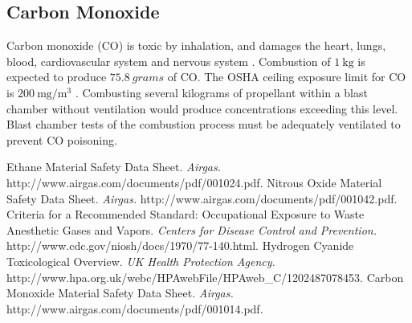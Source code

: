 \documentclass{article}
\begin{document}
\subsection{Carbon Monoxide}
Carbon monoxide (CO) is toxic by inhalation, and damages the heart, lungs, blood, cardiovascular system and nervous system \cite{COtox}.
Combustion of $\SI{1}{\kg}$ is expected to produce $\SI{75.8}{grams}$ of CO. 
The OSHA ceiling exposure limit for CO is $\SI{200}{\milli\gram\per\cubic\metre}$ \cite{COtox}. 
Combusting several kilograms of propellant within a blast chamber without ventilation would produce concentrations exceeding this level. 
Blast chamber tests of the combustion process must be adequately ventilated to prevent CO poisoning.

\begin{thebibliography}{9}
	 Ethane Material Safety Data Sheet. \emph{Airgas.} http://www.airgas.com/documents/pdf/001024.pdf.
	 Nitrous Oxide Material Safety Data Sheet. \emph{Airgas.} http://www.airgas.com/documents/pdf/001042.pdf.
	 Criteria for a Recommended Standard: Occupational Exposure to Waste Anesthetic Gases and Vapors. \emph{Centers for Disease Control and Prevention.} http://www.cdc.gov/niosh/docs/1970/77-140.html.
	 Hydrogen Cyanide Toxicological Overview. \emph{UK Health Protection Agency.} http://www.hpa.org.uk/webc/HPAwebFile/HPAweb\_C/1202487078453.
	 Carbon Monoxide Material Safety Data Sheet. \emph{Airgas.} http://www.airgas.com/documents/pdf/001014.pdf.
\end{thebibliography}
\end{document}
